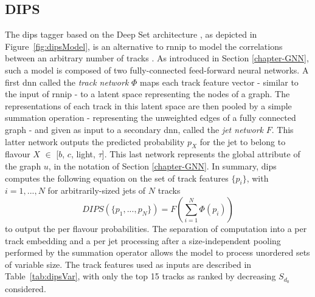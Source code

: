 \subsection{DIPS}
The \gls{dips} tagger based on the Deep Set architecture \cite{NIPS2017f22e4747}, as depicted in Figure~\ref{fig:dipsModel}, is an alternative to \gls{rnnip} to model the correlations between an arbitrary number of tracks \cite{ATL-PHYS-PUB-2020-014}. As introduced in Section \ref{chapter-GNN}, such a model is composed of two fully-connected feed-forward neural networks. A first \gls{dnn} called the \textit{track network} $\Phi$ maps each track feature vector - similar to the input of \gls{rnnip} - to a latent space representing the nodes of a graph. The representations of each track in this latent space are then pooled by a simple summation operation - representing the unweighted edges of a fully connected graph - and given as input to a secondary \gls{dnn}, called the \textit{jet network} $F$. This latter network outputs the predicted probability $p_X$ for the jet to belong to flavour $X$ $\in$ [$b$, $c$, light, $\tau$]. This last network represents the global attribute of the graph $u$, in the notation of Section \ref{chapter-GNN}. 
In summary, \gls{dips} computes the following equation on the set of track features $\{ p_i \}$, with $i = 1, ..., N$ for arbitrarily-sized jets of $N$ tracks
\begin{equation}
  DIPS( \{p_1, ..., p_N \} ) = F\left( \sum_{i=1}^N \Phi(p_i) \right)
\end{equation}
to output the per flavour probabilities. The separation of computation into a per track embedding and a per jet processing after a size-independent pooling performed by the summation operator allows the model to process unordered sets of variable size. The track features used as inputs are described in Table~\ref{tab:dipsVar}, with only the top 15 tracks as ranked by decreasing $S_{d_0}$ considered. \\

